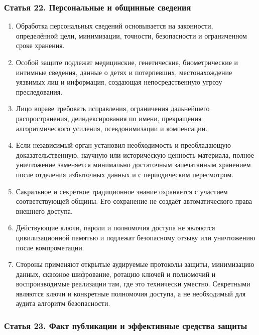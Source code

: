 \documentclass[
  russian,
  11pt,
  a4paper,
]{article}
\providecommand{\tightlist}{%
  \setlength{\itemsep}{0pt}\setlength{\parskip}{0pt}}
\begin{document}
\subsubsection{Статья 22. Персональные и общинные
сведения}\label{ux441ux442ux430ux442ux44cux44f-22-ux43fux435ux440ux441ux43eux43dux430ux43bux44cux43dux44bux435-ux438-ux43eux431ux449ux438ux43dux43dux44bux435-ux441ux432ux435ux434ux435ux43dux438ux44f}

\begin{enumerate}
\def\labelenumi{\arabic{enumi}.}
\tightlist
\item
  Обработка персональных сведений основывается на законности,
  определённой цели, минимизации, точности, безопасности и ограниченном
  сроке хранения.
\item
  Особой защите подлежат медицинские, генетические, биометрические и
  интимные сведения, данные о детях и потерпевших, местонахождение
  уязвимых лиц и информация, создающая непосредственную угрозу
  преследования.
\item
  Лицо вправе требовать исправления, ограничения дальнейшего
  распространения, деиндексирования по имени, прекращения
  алгоритмического усиления, псевдонимизации и компенсации.
\item
  Если независимый орган установил необходимость и преобладающую
  доказательственную, научную или историческую ценность материала,
  полное уничтожение заменяется минимально достаточным запечатанным
  хранением после отделения избыточных данных и с периодическим
  пересмотром.
\item
  Сакральное и секретное традиционное знание охраняется с участием
  соответствующей общины. Его сохранение не создаёт автоматического
  права внешнего доступа.
\item
  Действующие ключи, пароли и полномочия доступа не являются
  цивилизационной памятью и подлежат безопасному отзыву или уничтожению
  после компрометации.
\item
  Стороны применяют открытые аудируемые протоколы защиты, минимизацию
  данных, сквозное шифрование, ротацию ключей и полномочий и
  воспроизводимые реализации там, где это технически уместно. Секретными
  являются ключи и конкретные полномочия доступа, а не необходимый для
  аудита алгоритм безопасности.
\end{enumerate}

\subsubsection{Статья 23. Факт публикации и эффективные средства
защиты}\label{ux441ux442ux430ux442ux44cux44f-23-ux444ux430ux43aux442-ux43fux443ux431ux43bux438ux43aux430ux446ux438ux438-ux438-ux44dux444ux444ux435ux43aux442ux438ux432ux43dux44bux435-ux441ux440ux435ux434ux441ux442ux432ux430-ux437ux430ux449ux438ux442ux44b}
\end{document}
